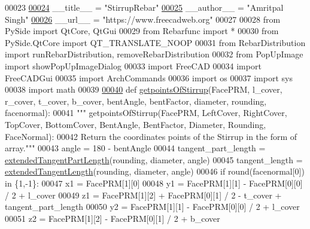 \begin{DoxyCode}
00023 
\hypertarget{Stirrup_8py_source.tex_l00024}{}\hyperlink{namespaceStirrup_aac4f16b6285f67fb07673ac264bac3dc}{00024} \_\_title\_\_ = \textcolor{stringliteral}{"StirrupRebar"}
\hypertarget{Stirrup_8py_source.tex_l00025}{}\hyperlink{namespaceStirrup_ad470a52dca49f918ddfef810e749291c}{00025} \_\_author\_\_ = \textcolor{stringliteral}{"Amritpal Singh"}
\hypertarget{Stirrup_8py_source.tex_l00026}{}\hyperlink{namespaceStirrup_a3b5b07aa3d0183155a2be24e2d0d4a82}{00026} \_\_url\_\_ = \textcolor{stringliteral}{"https://www.freecadweb.org"}
00027 
00028 \textcolor{keyword}{from} PySide \textcolor{keyword}{import} QtCore, QtGui
00029 \textcolor{keyword}{from} Rebarfunc \textcolor{keyword}{import} *
00030 \textcolor{keyword}{from} PySide.QtCore \textcolor{keyword}{import} QT\_TRANSLATE\_NOOP
00031 \textcolor{keyword}{from} RebarDistribution \textcolor{keyword}{import} runRebarDistribution, removeRebarDistribution
00032 \textcolor{keyword}{from} PopUpImage \textcolor{keyword}{import} showPopUpImageDialog
00033 \textcolor{keyword}{import} FreeCAD
00034 \textcolor{keyword}{import} FreeCADGui
00035 \textcolor{keyword}{import} ArchCommands
00036 \textcolor{keyword}{import} os
00037 \textcolor{keyword}{import} sys
00038 \textcolor{keyword}{import} math
00039 
\hypertarget{Stirrup_8py_source.tex_l00040}{}\hyperlink{namespaceStirrup_aa6df5118806bfe9d3a799e1bf549bb0a}{00040} \textcolor{keyword}{def }\hyperlink{namespaceStirrup_aa6df5118806bfe9d3a799e1bf549bb0a}{getpointsOfStirrup}(FacePRM, l\_cover, r\_cover, t\_cover, b\_cover, bentAngle, 
      bentFactor, diameter, rounding, facenormal):
00041     \textcolor{stringliteral}{""" getpointsOfStirrup(FacePRM, LeftCover, RightCover, TopCover, BottomCover, BentAngle, BentFactor,
       Diameter, Rounding, FaceNormal):}
00042 \textcolor{stringliteral}{    Return the coordinates points of the Stirrup in the form of array."""}
00043     angle = 180 - bentAngle
00044     tangent\_part\_length = \hyperlink{namespaceRebarfunc_aaeecb468e0fcfc5eee69d6a24c5c5aef}{extendedTangentPartLength}(rounding, diameter, angle)
00045     tangent\_length = \hyperlink{namespaceRebarfunc_ab5637ab0a8e202409ee8657d39ca87a0}{extendedTangentLength}(rounding, diameter, angle)
00046     \textcolor{keywordflow}{if} round(facenormal[0]) \textcolor{keywordflow}{in} \{1,-1\}:
00047         x1 = FacePRM[1][0]
00048         y1 = FacePRM[1][1] - FacePRM[0][0] / 2 + l\_cover
00049         z1 = FacePRM[1][2] + FacePRM[0][1] / 2 - t\_cover + tangent\_part\_length
00050         y2 = FacePRM[1][1] - FacePRM[0][0] / 2 + l\_cover
00051         z2 = FacePRM[1][2] - FacePRM[0][1] / 2 + b\_cover

\end{DoxyCode}

